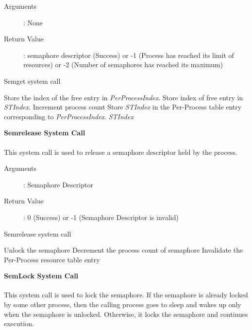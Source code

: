 \documentclass[10pt]{article}
\begin{document}
\begin{description}
\item[Arguments]: None
\item[Return Value]:  semaphore descriptor (Success) or -1 (Process has reached its limit of resources) or -2 (Number of semaphores has reached its maximum)
\end{description} 
\begin{algorithm}
\caption{Semget system call}
\begin{algorithmic}
\ELSE
    \STATE Store the index of the free entry in \textit{PerProcessIndex}.
\ENDIF
{}
\ELSE
    \STATE Store index of free entry in \textit{STIndex}.
    \STATE Increment process count
\ENDIF
\STATE Store \textit{STIndex} in the Per-Process table entry corresponding to \textit{PerProcessIndex}.
\RETURN \textit{STIndex}
\end{algorithmic}
\end{algorithm}
\textbf{Semrelease System Call}
\\ \\
This system call is used to release a semaphore descriptor held by the process.  
\begin{description}
\item[Arguments]: Semaphore Descriptor
\item[Return Value]: 0 (Success) or -1 (Semaphore Descriptor is invalid) 
\end{description} 
\begin{algorithm}
\caption{Semrelease system call}
\begin{algorithmic}
\ENDIF
{}
\ENDIF
{}
    \STATE Unlock the semaphore
\ENDIF
\STATE Decrement the process count of semaphore
\STATE Invalidate the Per-Process resource table entry 
\end{algorithmic}
\end{algorithm}
\vspace{3mm}
\textbf{SemLock System Call}
\\ \\
This system call is used to lock the semaphore. If the semaphore is already locked by some other process, then the calling process goes to sleep and wakes up only when the semaphore is unlocked. Otherwise, it locks the semaphore and continues execution. 
\end{document}
